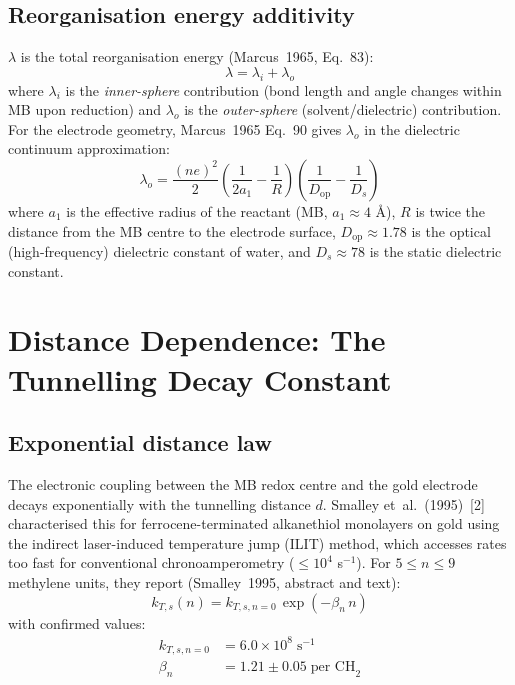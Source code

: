 \documentclass[10pt,a4paper]{article}
\numberwithin{equation}{section}
\newcommand{\cit}[1]{[#1]}
\begin{document}
\subsection{Reorganisation energy additivity}

$\lambda$ is the total reorganisation energy (Marcus~1965, Eq.~83):
\begin{equation}
  \lambda = \lambda_i + \lambda_o
  \label{eq:lambda}
\end{equation}
where $\lambda_i$ is the \textit{inner-sphere} contribution (bond
length and angle changes within MB upon reduction) and $\lambda_o$
is the \textit{outer-sphere} (solvent/dielectric) contribution.
For the electrode geometry, Marcus~1965 Eq.~90 gives $\lambda_o$ in
the dielectric continuum approximation:
\begin{equation}
  \lambda_o = \frac{(ne)^2}{2}
  \!\left(\frac{1}{2a_1} - \frac{1}{R}\right)
  \!\left(\frac{1}{D_{\text{op}}} - \frac{1}{D_s}\right)
  \label{eq:lambdao}
\end{equation}
where $a_1$ is the effective radius of the reactant (MB,
$a_1 \approx 4$ \AA), $R$ is twice the distance from the
MB centre to the electrode surface, $D_{\text{op}} \approx 1.78$ is
the optical (high-frequency) dielectric constant of water, and
$D_s \approx 78$ is the static dielectric constant.

\section{Distance Dependence: The Tunnelling Decay Constant}
\label{sec:dist}

\subsection{Exponential distance law}

The electronic coupling between the MB redox centre and the gold
electrode decays exponentially with the tunnelling distance $d$.
Smalley et~al.\ (1995)~\cit{2} characterised this for
ferrocene-terminated alkanethiol monolayers on gold using the
indirect laser-induced temperature jump (ILIT) method, which
accesses rates too fast for conventional chronoamperometry
($\leq 10^4$ s$^{-1}$). For $5 \leq n \leq 9$ methylene units,
they report (Smalley~1995, abstract and text):
\begin{equation}
  k_{T,s}(n) = k_{T,s,n=0}\,\exp(-\beta_n\,n)
  \label{eq:kndep}
\end{equation}
with confirmed values:
\begin{align}
  k_{T,s,n=0} &= 6.0 \times 10^8\;\text{s}^{-1}
  \label{eq:kn0}\\
  \beta_n &= 1.21 \pm 0.05\;\text{per CH}_2
  \label{eq:betan}
\end{align}
\end{document}
